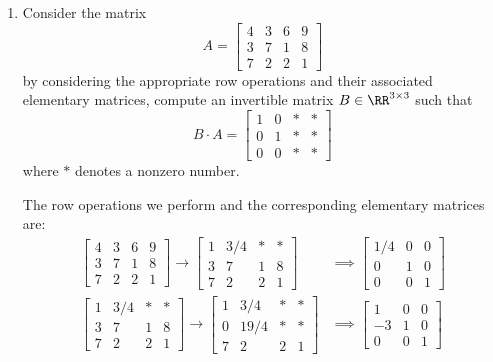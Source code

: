 \documentclass{article}
\begin{document}
\begin{enumerate}
	\item Consider the matrix \[A=\begin{bmatrix}
				4 & 3 & 6 & 9 \\
				3 & 7 & 1 & 8 \\
				7 & 2 & 2 & 1
		\end{bmatrix}\] by considering the appropriate row operations and their associated elementary matrices, compute an invertible matrix $B\in\RR^{3\times 3}$ such that \[B\cdot A = \begin{bmatrix}
				1 & 0 & * & * \\
				0 & 1 & * & * \\
				0 & 0 & * & *
		\end{bmatrix} \] where $*$ denotes a nonzero number.
		\begin{soln}
			The row operations we perform and the corresponding elementary matrices are:
			\begin{align*}
				\begin{bmatrix}
					4 & 3 & 6 & 9 \\
					3 & 7 & 1 & 8 \\
					7 & 2 & 2 & 1
				\end{bmatrix} \to \begin{bmatrix}
					1 & 3/4 & * & * \\
					3 & 7 & 1 & 8 \\
					7 & 2 & 2 & 1
				\end{bmatrix} &\implies \begin{bmatrix}
					1/4 & 0 & 0 \\
					0 & 1 & 0 \\
					0 & 0 & 1
				\end{bmatrix} \\
				\begin{bmatrix}
					1 & 3/4 & * & * \\
					3 & 7 & 1 & 8 \\
					7 & 2 & 2 & 1
				\end{bmatrix} \to \begin{bmatrix}
					1 & 3/4 & * & * \\
					0 & 19/4 & * & * \\
					7 & 2 & 2 & 1
				\end{bmatrix} &\implies \begin{bmatrix}
					1 & 0 & 0 \\
					-3 & 1 & 0 \\
					0 & 0 & 1
				\end{bmatrix} \\

\end{align*}
\end{soln}
\end{enumerate}
\end{document}
